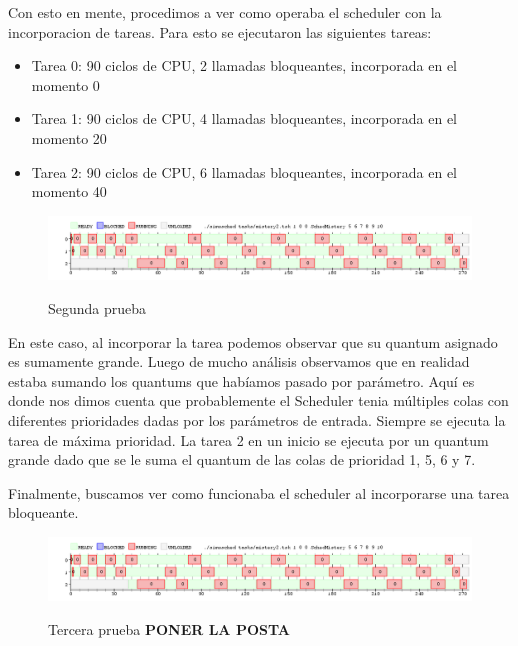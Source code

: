 \pagebreak

Con esto en mente, procedimos a ver como operaba el scheduler con la incorporacion de tareas. Para esto se ejecutaron las siguientes tareas:

\begin{itemize}
	\item Tarea 0: 90 ciclos de CPU, 2 llamadas bloqueantes, incorporada en el momento 0
	\item Tarea 1: 90 ciclos de CPU, 4 llamadas bloqueantes, incorporada en el momento 20
	\item Tarea 2: 90 ciclos de CPU, 6 llamadas bloqueantes, incorporada en el momento 40
\end{itemize}

\begin{figure}[h]
    \includegraphics[width=\linewidth]{images/mist2.png}
    \label{fig:Task Consola}
    \caption{Segunda prueba}
\end{figure}

En este caso, al incorporar la tarea podemos observar que su quantum asignado es sumamente grande. Luego de mucho análisis observamos que en realidad estaba sumando los quantums que habíamos pasado por parámetro. Aquí es donde nos dimos cuenta que probablemente el Scheduler tenia múltiples colas con diferentes prioridades dadas por los parámetros de entrada. Siempre se ejecuta la tarea de máxima prioridad. La tarea 2 en un inicio se ejecuta por un quantum grande dado que se le suma el quantum de las colas de prioridad 1, 5, 6 y 7.

\hspace{2px}

Finalmente, buscamos ver como funcionaba el scheduler al incorporarse una tarea bloqueante.

\begin{figure}[h]
    \includegraphics[width=\linewidth]{images/mist2.png}
    \label{fig:Task Consola}
    \caption{Tercera prueba \textbf{PONER LA POSTA}}
\end{figure}

